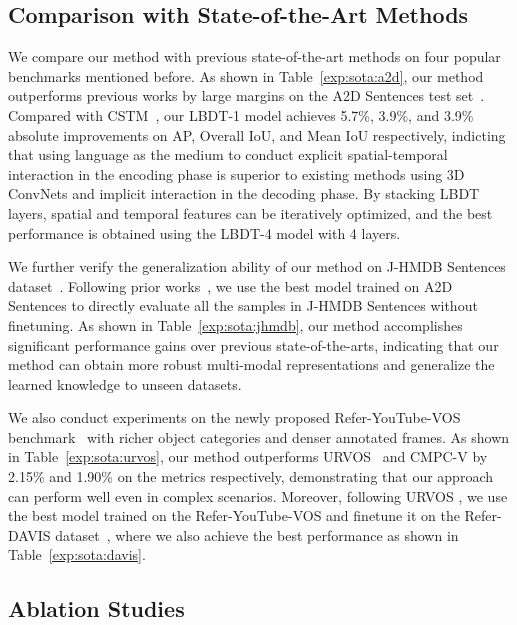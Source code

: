 \documentclass[10pt,twocolumn,letterpaper]{article}
\begin{document}
\subsection{Comparison with State-of-the-Art Methods}

We compare our method with previous state-of-the-art methods on four popular benchmarks mentioned before.
As shown in Table~\ref{exp:sota:a2d}, our method outperforms previous works by large margins on the A2D Sentences test set~\cite{GavrilyukGLS18}. Compared with CSTM~\cite{HuiH0DLWH021}, our LBDT-1 model achieves 5.7\%, 3.9\%, and 3.9\% absolute improvements on AP, Overall IoU, and Mean IoU respectively, indicting that using language as the medium to conduct explicit spatial-temporal interaction in the encoding phase is superior to existing methods using 3D ConvNets and implicit interaction in the decoding phase. By stacking LBDT layers, spatial and temporal features can be iteratively optimized, and the best performance is obtained using the LBDT-4 model with 4 layers.

We further verify the generalization ability of our method on J-HMDB Sentences dataset~\cite{GavrilyukGLS18}.
Following prior works~\cite{HuiH0DLWH021,NingXW020,WangDMY20}, we use the best model trained on A2D Sentences to directly evaluate all the samples in J-HMDB Sentences without finetuning.
As shown in Table~\ref{exp:sota:jhmdb}, our method accomplishes significant performance gains over previous state-of-the-arts, indicating that our method can obtain more robust multi-modal representations and generalize the learned knowledge to unseen datasets.





We also conduct experiments on the newly proposed Refer-YouTube-VOS benchmark~\cite{seo2020urvos} with richer object categories and denser annotated frames.
As shown in Table~\ref{exp:sota:urvos}, our method outperforms URVOS~\cite{seo2020urvos} and CMPC-V \cite{liu2021cross} by 2.15\% and 1.90\% on the  metrics respectively, demonstrating that our approach can perform well even in complex scenarios.  Moreover, following URVOS \cite{seo2020urvos}, we use the best model trained on the Refer-YouTube-VOS and finetune it on the Refer-DAVIS dataset~\cite{khoreva2018video}, where we also achieve the best performance as shown in Table~\ref{exp:sota:davis}.

\subsection{Ablation Studies}
\end{document}
